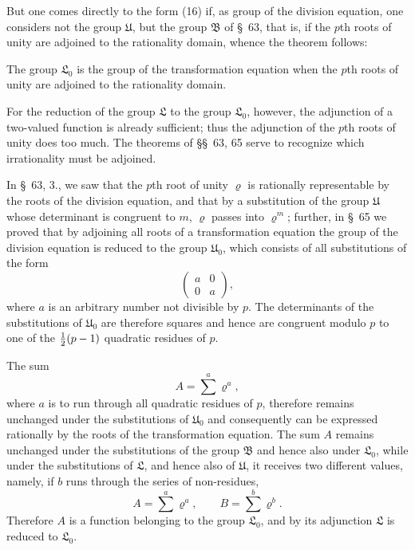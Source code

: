 \documentclass[11pt]{article}
\begin{document}
But one comes directly to the form (16) if, as group of the division equation, one considers not the group $\mathfrak U$, but the group $\mathfrak B$ of \S~63, that is, if the $p$th roots of unity are adjoined to the rationality domain, whence the theorem follows:

The group $\mathfrak L_0$ is the group of the transformation equation when the $p$th roots of unity are adjoined to the rationality domain.

For the reduction of the group $\mathfrak L$ to the group $\mathfrak L_0$, however, the adjunction of a two-valued function is already sufficient; thus the adjunction of the $p$th roots of unity does too much. The theorems of \S\S~63, 65 serve to recognize which irrationality must be adjoined.

In \S~63, 3., we saw that the $p$th root of unity $\varrho$ is rationally representable by the roots of the division equation, and that by a substitution of the group $\mathfrak U$ whose determinant is congruent to $m$, $\varrho$ passes into $\varrho^m$; further, in \S~65 we proved that by adjoining all roots of a transformation equation the group of the division equation is reduced to the group $\mathfrak U_0$, which consists of all substitutions of the form
\begin{equation}
\begin{pmatrix}a&0\\0&a\end{pmatrix},
\tag{18}
\end{equation}
where $a$ is an arbitrary number not divisible by $p$. The determinants of the substitutions of $\mathfrak U_0$ are therefore squares and hence are congruent modulo $p$ to one of the ${1\over2}(p-1)$ quadratic residues of $p$.

The sum
\begin{equation}
 A=\sum^a \varrho^a,
\tag{19}
\end{equation}
where $a$ is to run through all quadratic residues of $p$, therefore remains unchanged under the substitutions of $\mathfrak U_0$ and consequently can be expressed rationally by the roots of the transformation equation. The sum $A$ remains unchanged under the substitutions of the group $\mathfrak B$ and hence also under $\mathfrak L_0$, while under the substitutions of $\mathfrak L$, and hence also of $\mathfrak U$, it receives two different values, namely, if $b$ runs through the series of non-residues,
\[
 A=\sum^a\varrho^a,
 \qquad
 B=\sum^b\varrho^b.
\]
Therefore $A$ is a function belonging to the group $\mathfrak L_0$, and by its adjunction $\mathfrak L$ is reduced to $\mathfrak L_0$.
\end{document}
